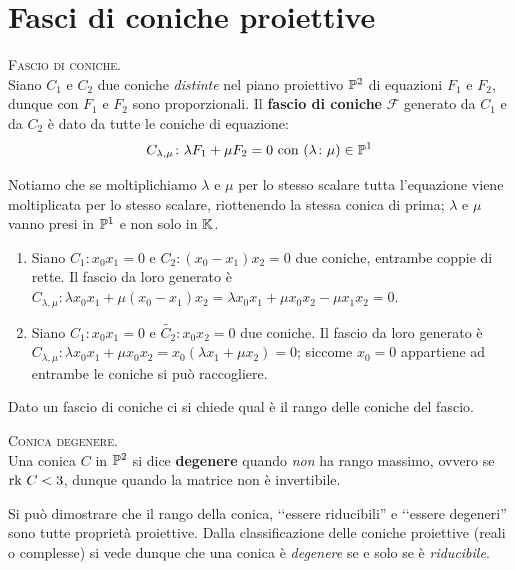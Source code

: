 		\section{Fasci di coniche proiettive}
		\begin{define}\textsc{Fascio di coniche.}\\
			Siano $C_1$ e $C_2$ due coniche \textit{distinte} nel piano proiettivo $\proj[2]{\ }$ di equazioni $F_1$ e $F_2$, dunque con $F_1$ e $F_2$ sono proporzionali. Il \textbf{fascio di coniche} $\mathcal{F}$ generato da $C_1$ e da $C_2$ è dato da tutte le coniche di equazione:
			\begin{equation}
				C_{\lambda,\mu}\colon \lambda F_1+\mu F_2=0\text{ con }(\lambda\colon \mu)\in \proj[1]{\ }
			\end{equation}
		\vspace{-6mm}
		\end{define}
Notiamo che se moltiplichiamo $\lambda$ e $\mu$ per lo stesso scalare tutta l'equazione viene moltiplicata per lo stesso scalare, riottenendo la stessa conica di prima; $\lambda$ e $\mu$ vanno presi in $\proj[1]{\ }$ e non solo in $\mathbb{K}$.
\begin{examples}
	\begin{enumerate}
		\item	Siano $C_1\colon x_0x_1=0$ e $C_2\colon (x_0-x_1)x_2=0$ due coniche, entrambe coppie di rette. Il fascio da loro generato è $C_{\lambda,\mu}\colon \lambda x_0x_1 + \mu (x_0-x_1)x_2=\lambda x_0x_1 + \mu x_0x_2 -\mu x_1x_2=0$.
		\item	Siano $C_1\colon x_0x_1=0$ e $\widetilde{C_2}\colon x_0x_2=0$ due coniche. Il fascio da loro generato è $C_{\lambda,\mu}\colon \lambda x_0x_1 +\mu x_0x_2=x_0(\lambda x_1 + \mu x_2)=0$; siccome $x_0=0$ appartiene ad entrambe le coniche si può raccogliere.
	\end{enumerate}
\vspace{-3mm}
\end{examples}
Dato un fascio di coniche ci si chiede qual è il rango delle coniche del fascio.
\begin{define}\textsc{Conica degenere.}\\ 
Una conica $C$ in $\proj[2]{\ }$ si dice \textbf{degenere} quando \textit{non} ha rango massimo, ovvero se $\mathrm{rk}\  C< 3$, dunque quando la matrice non è invertibile.
\end{define}
\begin{digression}
	 Si può dimostrare che il rango della conica,  ‘‘essere riducibili'' e ‘‘essere degeneri'' sono tutte proprietà proiettive. Dalla classificazione delle coniche proiettive (reali o complesse) si vede dunque che una conica è \textit{degenere} se e solo se è \textit{riducibile}.
\end{digression}
